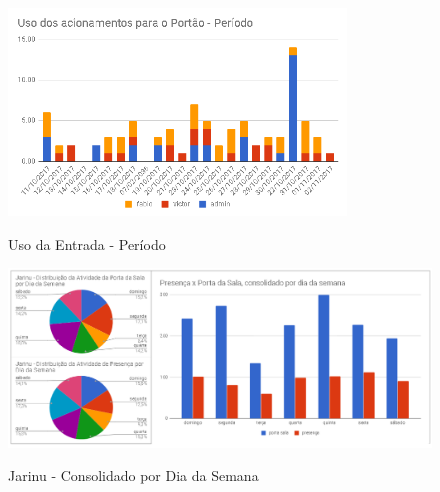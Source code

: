 \begin{figure}[H]
	\centering
	\caption{Uso da Entrada - Período}
	\includegraphics[width=0.8\textwidth]{usoacessoperiodo}
	\label{fig:usoacessoperiodo}
\end{figure}

\begin{figure}[H]
	\centering
	\caption{Jarinu - Consolidado por Dia da Semana}
	\includegraphics[width=1.0\textwidth]{JarinuDiaSemana}
	\label{fig:JarinuDiaSemana}
\end{figure}